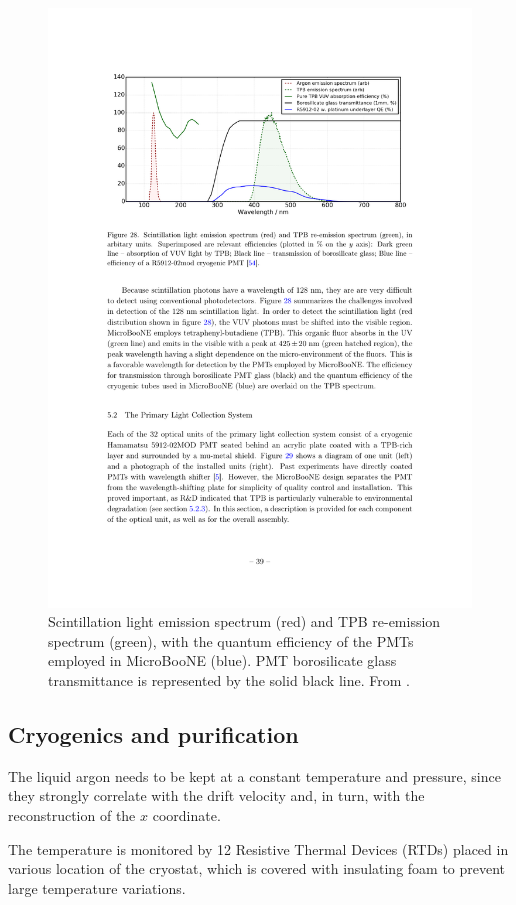\begin{figure}[htbp]
    \centering
    \includegraphics[width=0.85\linewidth]{figures/light.pdf}
    \caption{Scintillation light emission spectrum (red) and TPB re-emission spectrum (green), with the quantum efficiency of the PMTs employed in MicroBooNE (blue). PMT borosilicate glass transmittance is represented by the solid black line. From \cite{Acciarri:2016sli}.}
    \label{fig:light}
\end{figure}

\subsection{Cryogenics and purification}
The liquid argon needs to be kept at a constant temperature and pressure, since they strongly correlate with the drift velocity and, in turn, with the reconstruction of the $x$ coordinate.

The temperature is monitored by 12 Resistive Thermal Devices (RTDs) placed in various location of the cryostat, which is covered with insulating foam to prevent large temperature variations. 

